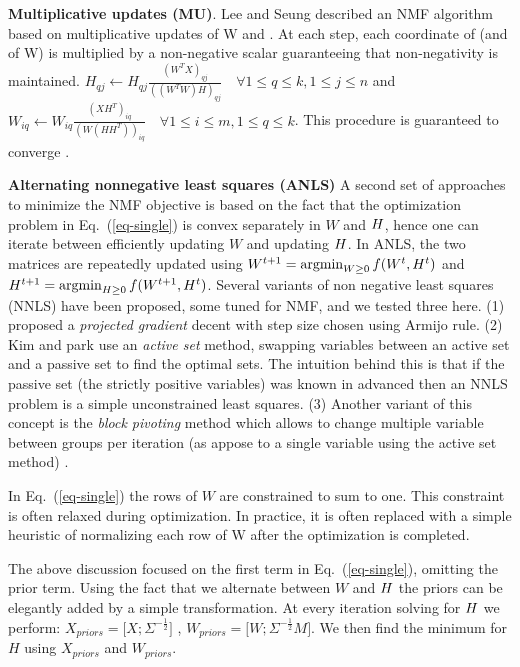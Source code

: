 \documentclass{article} %
\newcommand{\W}{W}
\renewcommand{\eqref}[1]{Eq.~(\ref{#1})}
\begin{document}
{\bf {Multiplicative updates (MU)}}. Lee and Seung \cite{leenmfs} described an NMF algorithm based on multiplicative updates of W and \Htext. At each step, each coordinate of \Htext{} (and of \W) is multiplied by a non-negative scalar guaranteeing that non-negativity is maintained. $H_{qj} \leftarrow H_{qj} \frac{(W^TX)_{qj}}{((W^TW)H)_{qj}} \quad
\forall 1\leq q \leq k, 1\leq j \leq n$ and $W_{iq} \leftarrow W_{iq} \frac{(XH^T)_{iq}}{(W(HH^T))_{iq}} \quad \forall 1\leq i \leq m, 1\leq q \leq k$.
This procedure is guaranteed to converge \cite{leenmfs,lin2007convergence}. 

{\bf{Alternating nonnegative least squares} (ANLS)} A second set of approaches to minimize the NMF objective is based on the fact that the optimization problem in \eqref{eq-single} is convex separately in $\W$ and ${H}$, hence one can iterate between efficiently updating $\W$ and updating ${H}$. In ANLS, the two matrices are  repeatedly updated using $ W^{t+1} = \argmin_{W \geq 0 } f(W^t, H^t)$ and $H^{t+1} = \argmin_{H \geq 0 } f(W^{t+1},H^t)$. Several variants of non negative least squares (NNLS) have been proposed, some tuned for NMF, and we tested three here.  (1) \citet{lin2007projected} proposed a {\em projected gradient} decent with step size chosen using Armijo rule. (2) Kim and park \cite{kim2008activeset,kim2011fast} use an {\em active set} method, swapping variables between an active set and a passive set to find the optimal sets. The intuition behind this is that if the passive set (the strictly positive variables) was known in advanced then an NNLS problem is a simple unconstrained least squares. (3) Another variant of this concept is the {\em block pivoting} method which allows to change multiple variable between groups per iteration (as appose to a single variable using the active set method) \cite{kim2011fast}.

In \eqref{eq-single} the rows of $\W$ are constrained to sum to one. This constraint is often relaxed during optimization. In practice, it is often replaced with a simple heuristic of normalizing each row of W after the optimization is completed. 

The above discussion focused on the first term in \eqref{eq-single}, omitting the prior term. Using the fact that we alternate between $\W$ and ${H}$ the priors can be elegantly added by a simple transformation. At every iteration solving for ${H}$ we perform: 
$ X_{priors} = \Big[ X ;\Sigma^{-\frac{1}{2}} \Big] $  ,  $ \W_{priors} = \Big[  \W ; \Sigma^{-\frac{1}{2}} M \Big]  $. We then find the minimum for $H$ using $X_{priors} $ and $W_{priors} $. 
\end{document}
